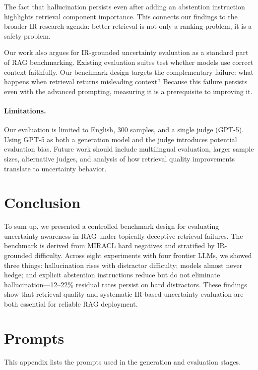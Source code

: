\documentclass[sigconf,review,anonymous]{acmart}
\begin{document}
The fact that hallucination persists even after adding an abstention instruction highlights retrieval component importance. 
This connects our findings to the broader IR research agenda: better retrieval is not only a ranking problem, it is a safety problem.

Our work also argues for IR-grounded uncertainty evaluation as a standard part of RAG benchmarking. 
Existing evaluation suites test whether models use correct context faithfully. 
Our benchmark design targets the complementary failure: what happens when retrieval returns misleading context? 
Because this failure persists even with the advanced prompting, measuring it is a prerequisite to improving it.

\paragraph{Limitations.}
Our evaluation is limited to English, 300 samples, and a single judge (GPT-5). 
Using GPT-5 as both a generation model and the judge introduces potential evaluation bias. 
Future work should include multilingual evaluation, larger sample sizes, alternative judges, and analysis of how retrieval quality improvements translate to uncertainty behavior.

\section{Conclusion}

To sum up, we presented a controlled benchmark design for evaluating uncertainty awareness in RAG under topically-deceptive retrieval failures. 
The benchmark is derived from MIRACL hard negatives and stratified by IR-grounded difficulty. 
Across eight experiments with four frontier LLMs, we showed three things: hallucination rises with distractor difficulty; models almost never hedge; and explicit abstention instructions reduce but do not eliminate hallucination---12--22\% residual rates persist on hard distractors. 
These findings show that retrieval quality and systematic IR-based uncertainty evaluation are both essential for reliable RAG deployment. 

\appendix

\section{Prompts}
\label{app:prompts}

This appendix lists the prompts used in the generation and evaluation stages.
\end{document}
